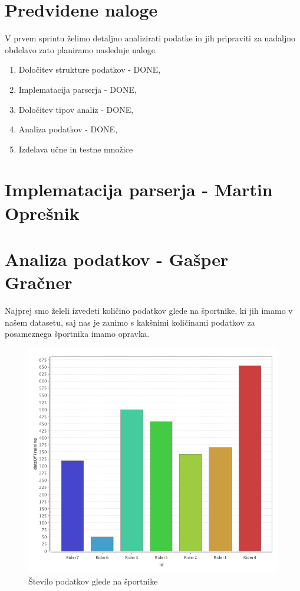 \documentclass[a4paper,11pt]{article}
\begin{document}
\section{Predvidene naloge}
V prvem sprintu želimo detaljno analizirati podatke in jih pripraviti za nadaljno obdelavo zato planiramo naslednje naloge.
	\begin{enumerate}
		\item{Določitev strukture podatkov - \textcolor{OliveGreen}{DONE},}
		\item{Implematacija parserja - \textcolor{OliveGreen}{DONE},}
		\item{Določitev tipov analiz - \textcolor{OliveGreen}{DONE},}
		\item{Analiza podatkov - \textcolor{OliveGreen}{DONE},}
		\item{Izdelava učne in testne množice}
	\end{enumerate}
\newpage

\section{Implematacija parserja - Martin Oprešnik}


\newpage
\section{Analiza podatkov - Gašper Gračner}
Najprej smo želeli izvedeti količino podatkov glede na športnike, ki jih imamo v našem datasetu, saj nas je zanimo s kakšnimi količinami podatkov za posameznega športnika imamo opravka. \\

\begin{figure}[H]
\caption{Število podatkov glede na športnike}
\centering
\includegraphics[width=1\textwidth]{ridersTrainingsCount}
\end{figure}
\end{document}
